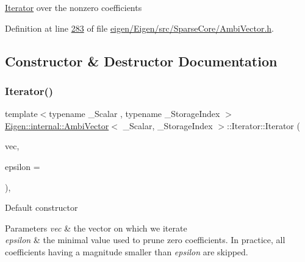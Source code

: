 \hyperlink{class_eigen_1_1internal_1_1_ambi_vector_1_1_iterator}{Iterator} over the nonzero coefficients 

Definition at line \hyperlink{eigen_2_eigen_2src_2_sparse_core_2_ambi_vector_8h_source_l00283}{283} of file \hyperlink{eigen_2_eigen_2src_2_sparse_core_2_ambi_vector_8h_source}{eigen/\+Eigen/src/\+Sparse\+Core/\+Ambi\+Vector.\+h}.



\subsection{Constructor \& Destructor Documentation}
\mbox{\label{class_eigen_1_1internal_1_1_ambi_vector_1_1_iterator_a2201eecfa8e104d9f2017e47c5f24583}} 
\subsubsection{\texorpdfstring{Iterator()}{Iterator()}\hspace{0.1cm}{\footnotesize\ttfamily [1/2]}}
{\footnotesize\ttfamily template$<$typename \+\_\+\+Scalar , typename \+\_\+\+Storage\+Index $>$ \\
\hyperlink{class_eigen_1_1internal_1_1_ambi_vector}{Eigen\+::internal\+::\+Ambi\+Vector}$<$ \+\_\+\+Scalar, \+\_\+\+Storage\+Index $>$\+::Iterator\+::\+Iterator (\begin{DoxyParamCaption}\item[{const \hyperlink{class_eigen_1_1internal_1_1_ambi_vector}{Ambi\+Vector} \&}]{vec,  }\item[{const Real\+Scalar \&}]{epsilon = {} }\end{DoxyParamCaption})\hspace{0.3cm}{\ttfamily [inline]}, {\ttfamily [explicit]}}

Default constructor 
\begin{DoxyParams}{Parameters}
{\em vec} & the vector on which we iterate \\
\hline
{\em epsilon} & the minimal value used to prune zero coefficients. In practice, all coefficients having a magnitude smaller than {\itshape epsilon} are skipped. \\
\hline
\end{DoxyParams}


